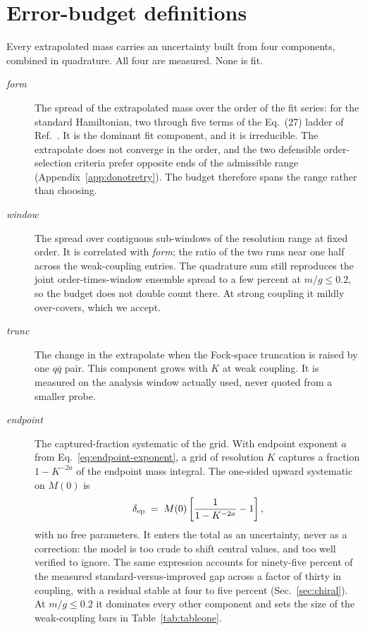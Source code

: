 \section{Error-budget definitions}
\label{app:budget}

Every extrapolated mass carries an uncertainty built from four components,
combined in quadrature.  All four are measured.  None is fit.

\begin{description}
\item[\textnormal{\emph{form}}] The spread of the extrapolated mass over
  the order of the fit series: for the standard Hamiltonian, two through
  five terms of the Eq.~(27) ladder of Ref.~\cite{Hornbostel:1988fb}.  It
  is the dominant fit component, and it is irreducible.  The extrapolate
  does not converge in the order, and the two defensible order-selection
  criteria prefer opposite ends of the admissible range
  (Appendix~\ref{app:donotretry}).  The budget therefore spans the range
  rather than choosing.
\item[\textnormal{\emph{window}}] The spread over contiguous sub-windows of
  the resolution range at fixed order.  It is correlated with \emph{form};
  the ratio of the two runs near one half across the weak-coupling entries.
  The quadrature sum still reproduces the joint order-times-window ensemble
  spread to a few percent at $m/g \le 0.2$, so the budget does not double
  count there.  At strong coupling it mildly over-covers, which we accept.
\item[\textnormal{\emph{trunc}}] The change in the extrapolate when the
  Fock-space truncation is raised by one $q\bar q$ pair.  This component
  grows with $K$ at weak coupling.  It is measured on the analysis window
  actually used, never quoted from a smaller probe.
\item[\textnormal{\emph{endpoint}}] The captured-fraction systematic of the
  grid.  With endpoint exponent $a$ from Eq.~\eqref{eq:endpoint-exponent},
  a grid of resolution $K$ captures a fraction $1 - K^{-2a}$ of the
  endpoint mass integral.  The one-sided upward systematic on $M(0)$ is
  \begin{equation}
    \delta_{\rm ep} \;=\; M(0)\left[\frac{1}{1-K^{-2a}} - 1\right],
    \label{eq:endpoint-budget}
  \end{equation}
  with no free parameters.  It enters the total as an uncertainty, never as
  a correction: the model is too crude to shift central values, and too
  well verified to ignore.  The same expression accounts for ninety-five
  percent of the measured standard-versus-improved gap across a factor of
  thirty in coupling, with a residual stable at four to five percent
  (Sec.~\ref{sec:chiral}).  At $m/g \le 0.2$ it dominates every other
  component and sets the size of the weak-coupling bars in
  Table~\ref{tab:tableone}.
\end{description}

